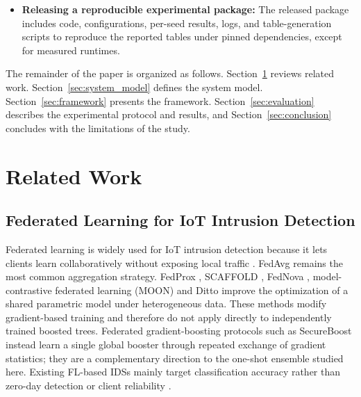 \documentclass[pdflatex,sn-mathphys-num]{sn-jnl}
\begin{document}
{\begin{itemize}
\item \textbf{Releasing a reproducible experimental package:}
The released package includes code, configurations, per-seed results, logs, and table-generation scripts to reproduce the reported tables under pinned dependencies, except for measured runtimes.

\end{itemize}

The remainder of the paper is organized as follows. Section~\ref{sec:related_work} reviews related work. Section~\ref{sec:system_model} defines the system model. Section~\ref{sec:framework} presents the framework. Section~\ref{sec:evaluation} describes the experimental protocol and results, and Section~\ref{sec:conclusion} concludes with the limitations of the study.

\section{Related Work}
\label{sec:related_work}

\subsection{Federated Learning for IoT Intrusion Detection}

{\color{black}Federated learning is widely used for IoT intrusion detection because it lets clients learn collaboratively without exposing local traffic \cite{mcmahan2017fedavg,kairouz2021advances,yang2019federated}. FedAvg \cite{mcmahan2017fedavg} remains the most common aggregation strategy. FedProx \cite{li2020fedprox}, SCAFFOLD \cite{karimireddy2020scaffold}, FedNova \cite{wang2020fednova}, model-contrastive federated learning (MOON) \cite{li2021moon} and Ditto \cite{li2021ditto} improve the optimization of a shared parametric model under heterogeneous data. These methods modify gradient-based training and therefore do not apply directly to independently trained boosted trees. Federated gradient-boosting protocols such as SecureBoost \cite{cheng2021secureboost} instead learn a single global booster through repeated exchange of gradient statistics; they are a complementary direction to the one-shot ensemble studied here. Existing FL-based IDSs mainly target classification accuracy rather than zero-day detection or client reliability \cite{javeed2024zerotrust}.}

}
\end{document}
